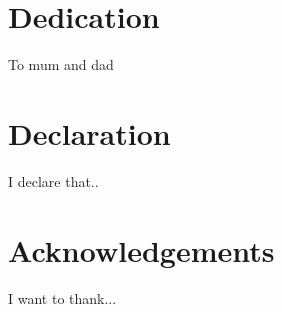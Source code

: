 

\tableofcontents


\newpage



 
\chapter*{Dedication}
To mum and dad

 
\chapter*{Declaration}
I declare that..

 
\chapter*{Acknowledgements}
I want to thank...



